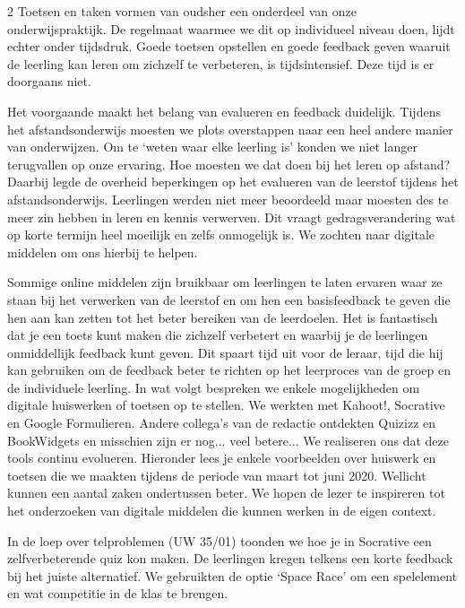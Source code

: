 \begin{multicols}{2}
Toetsen en taken vormen van oudsher een onderdeel van onze onderwijspraktijk. De regelmaat waarmee we dit op individueel niveau doen, lijdt echter onder tijdsdruk. Goede toetsen opstellen en goede feedback geven waaruit de leerling kan leren om zichzelf te verbeteren, is tijdsintensief. Deze tijd is er doorgaans niet.

Het voorgaande maakt het belang van evalueren en feedback duidelijk. Tijdens het afstandsonderwijs moesten we plots overstappen naar een heel andere manier van onderwijzen. Om te `weten waar elke leerling is' konden we niet langer terugvallen op onze ervaring. Hoe moesten we dat doen bij het leren op afstand? Daarbij legde de overheid beperkingen op het evalueren van de leerstof tijdens het afstandsonderwijs. Leerlingen werden niet meer beoordeeld maar moesten des te meer zin hebben in leren en kennis verwerven. Dit vraagt gedragsverandering wat op korte termijn heel moeilijk en zelfs onmogelijk is. We zochten naar digitale middelen om ons hierbij te helpen. 

Sommige online middelen zijn bruikbaar om leerlingen te laten ervaren waar ze staan bij het verwerken van de leerstof en om hen een basisfeedback te geven die hen aan kan zetten tot het beter bereiken van de leerdoelen. Het is fantastisch dat je een toets kunt maken die zichzelf verbetert en waarbij je de leerlingen onmiddellijk feedback kunt geven. Dit spaart tijd uit voor de leraar, tijd die hij kan gebruiken om de feedback beter te richten op het leerproces van de groep en de individuele leerling. In wat volgt bespreken we enkele mogelijkheden om digitale huiswerken of toetsen op te stellen. We werkten met Kahoot!, Socrative en Google Formulieren. Andere collega's van de redactie ontdekten Quizizz en BookWidgets en misschien zijn er nog... veel betere... We realiseren ons dat deze tools continu evolueren. Hieronder lees je enkele voorbeelden over huiswerk en toetsen die we maakten tijdens de periode van maart tot juni 2020. Wellicht kunnen een aantal zaken ondertussen beter. We hopen de lezer te inspireren tot het onderzoeken van digitale middelen die kunnen werken in de eigen context.
\newpage


In de loep over telproblemen (UW 35/01) toonden we hoe je in Socrative een zelfverbeterende quiz kon maken. De leerlingen kregen telkens een korte feedback bij het juiste alternatief. We gebruikten de optie `Space Race' om een spelelement en wat competitie in de klas te brengen. 


\end{multicols}
